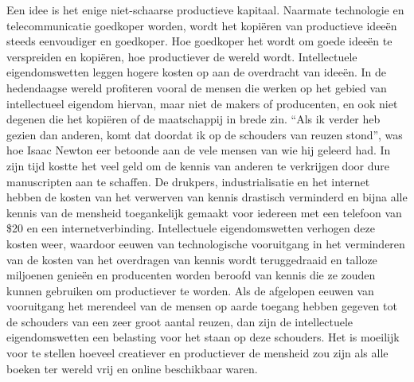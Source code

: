 Een idee is het enige niet-schaarse productieve kapitaal. Naarmate technologie en telecommunicatie goedkoper worden, wordt het kopiëren van productieve ideeën steeds eenvoudiger en goedkoper. Hoe goedkoper het wordt om goede ideeën te verspreiden en kopiëren, hoe productiever de wereld wordt. Intellectuele eigendomswetten leggen hogere kosten op aan de overdracht van ideeën. In de hedendaagse wereld profiteren vooral de mensen die werken op het gebied van intellectueel eigendom hiervan, maar niet de makers of producenten, en ook niet degenen die het kopiëren of de maatschappij in brede zin. ``Als ik verder heb gezien dan anderen, komt dat doordat ik op de schouders van reuzen stond'', was hoe Isaac Newton eer betoonde aan de vele mensen van wie hij geleerd had. In zijn tijd kostte het veel geld om de kennis van anderen te verkrijgen door dure manuscripten aan te schaffen. De drukpers, industrialisatie en het internet hebben de kosten van het verwerven van kennis drastisch verminderd en bijna alle kennis van de mensheid toegankelijk gemaakt voor iedereen met een telefoon van \$20 en een internetverbinding. Intellectuele eigendomswetten verhogen deze kosten weer, waardoor eeuwen van technologische vooruitgang in het verminderen van de kosten van het overdragen van kennis wordt teruggedraaid en talloze miljoenen genieën en producenten worden beroofd van kennis die ze zouden kunnen gebruiken om productiever te worden. Als de afgelopen eeuwen van vooruitgang het merendeel van de mensen op aarde toegang hebben gegeven tot de schouders van een zeer groot aantal reuzen, dan zijn de intellectuele eigendomswetten een belasting voor het staan op deze schouders. Het is moeilijk voor te stellen hoeveel creatiever en productiever de mensheid zou zijn als alle boeken ter wereld vrij en online beschikbaar waren.
